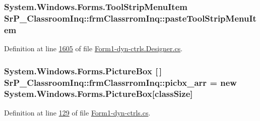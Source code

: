 \hypertarget{class_sr_p___classroom_inq_1_1frm_classrrom_inq_a6cd3b1f68a59b97544531e749b77e868}{
\subsubsection[{paste\-Tool\-Strip\-Menu\-Item}]{\setlength{\rightskip}{0pt plus 5cm}\-System.\-Windows.\-Forms.\-Tool\-Strip\-Menu\-Item {\bf \-Sr\-P\-\_\-\-Classroom\-Inq\-::frm\-Classrrom\-Inq\-::paste\-Tool\-Strip\-Menu\-Item}}}
\label{class_sr_p___classroom_inq_1_1frm_classrrom_inq_a6cd3b1f68a59b97544531e749b77e868}


\-Definition at line \hyperlink{_form1-dyn-ctrls_8_designer_8cs_source_l01605}{1605} of file \hyperlink{_form1-dyn-ctrls_8_designer_8cs_source}{\-Form1-\/dyn-\/ctrls.\-Designer.\-cs}.

\hypertarget{class_sr_p___classroom_inq_1_1frm_classrrom_inq_a067a85853fc3e38cf6343917c4fb061a}{
\subsubsection[{picbx\-\_\-arr}]{\setlength{\rightskip}{0pt plus 5cm}\-System.\-Windows.\-Forms.\-Picture\-Box \mbox{[}$\,$\mbox{]} {\bf \-Sr\-P\-\_\-\-Classroom\-Inq\-::frm\-Classrrom\-Inq\-::picbx\-\_\-arr} = new \-System.\-Windows.\-Forms.\-Picture\-Box\mbox{[}{\bf class\-Size}\mbox{]}}}
\label{class_sr_p___classroom_inq_1_1frm_classrrom_inq_a067a85853fc3e38cf6343917c4fb061a}


\-Definition at line \hyperlink{_form1-dyn-ctrls_8cs_source_l00129}{129} of file \hyperlink{_form1-dyn-ctrls_8cs_source}{\-Form1-\/dyn-\/ctrls.\-cs}.

